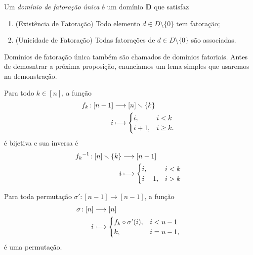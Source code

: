 \begin{definition}
Um \emph{domínio de fatoração única} é um domínio $\bm D$ que satisfaz
	\begin{enumerate}
	\item (Existência de Fatoração) Todo elemento $d \in D \setminus \{0\}$ tem fatoração;
	\item (Unicidade de Fatoração) Todas fatorações de $d \in D \setminus \{0\}$ são associadas.
	\end{enumerate}
\end{definition}

Domínios de fatoração única também são chamados de domínios fatoriais. Antes de demosntrar a próxima proposição, enunciamos um lema simples que usaremos na demonstração.

\begin{lemma}
\label{conj:prop:permut.tranlad}
Para todo $k \in [n]$, a função
	\begin{align*}
	{f_k}\colon {[n-1]} &\longrightarrow {[n]\smallsetminus\{k\}} \\{i} &\longmapsto \begin{cases}
		i,& i < k \\
		i+1,& i \geq k.
		\end{cases}
	\end{align*}
é bijetiva e sua inversa é
	\begin{align*}
	{{f_k}^{-1}}\colon {[n]\smallsetminus\{k\}} &\longrightarrow {[n-1]} \\{i} &\longmapsto \begin{cases}
		i,& i < k \\
		i-1,& i > k
		\end{cases}
	\end{align*}

Para toda permutação $\sigma'\colon [n-1] \to [n-1]$, a função
	\begin{align*}
	{\sigma}\colon {[n]} &\longrightarrow {[n]} \\{i} &\longmapsto \begin{cases}
		f_k \circ \sigma' (i), & i < n-1 \\
		k, & i = n-1,
		\end{cases}
	\end{align*}
é uma permutação.
\end{lemma}
